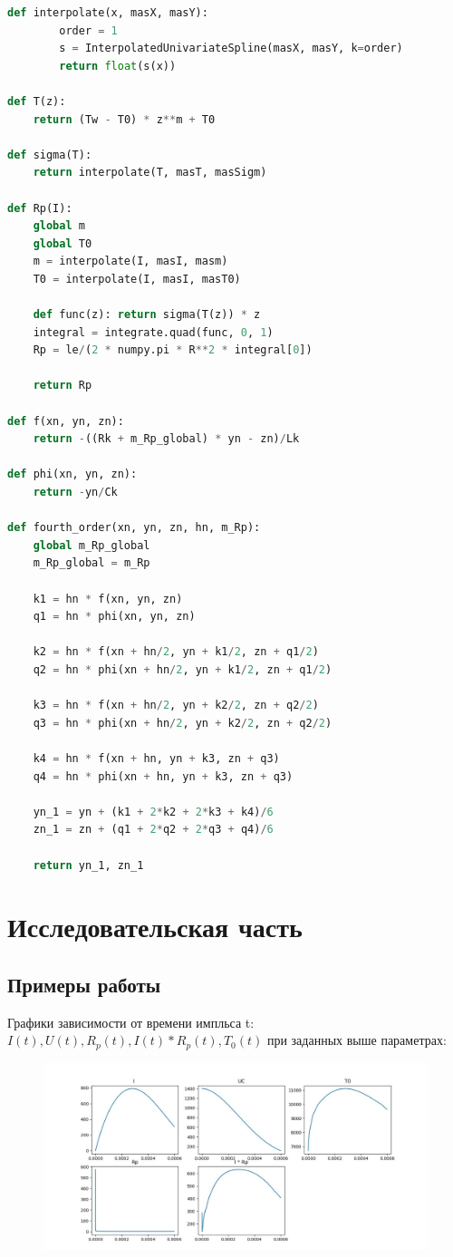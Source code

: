 \documentclass[a4paper, 12pt]{article}
\begin{document}
	\begin{lstlisting}[language=Python]
def interpolate(x, masX, masY):
		order = 1
		s = InterpolatedUnivariateSpline(masX, masY, k=order)
		return float(s(x))

def T(z):
	return (Tw - T0) * z**m + T0

def sigma(T):
	return interpolate(T, masT, masSigm)

def Rp(I):
	global m
	global T0
	m = interpolate(I, masI, masm)
	T0 = interpolate(I, masI, masT0)

	def func(z): return sigma(T(z)) * z
	integral = integrate.quad(func, 0, 1)
	Rp = le/(2 * numpy.pi * R**2 * integral[0])

	return Rp

def f(xn, yn, zn):
	return -((Rk + m_Rp_global) * yn - zn)/Lk

def phi(xn, yn, zn):
	return -yn/Ck

def fourth_order(xn, yn, zn, hn, m_Rp):
	global m_Rp_global
	m_Rp_global = m_Rp

	k1 = hn * f(xn, yn, zn)
	q1 = hn * phi(xn, yn, zn)

	k2 = hn * f(xn + hn/2, yn + k1/2, zn + q1/2)
	q2 = hn * phi(xn + hn/2, yn + k1/2, zn + q1/2)

	k3 = hn * f(xn + hn/2, yn + k2/2, zn + q2/2)
	q3 = hn * phi(xn + hn/2, yn + k2/2, zn + q2/2)

	k4 = hn * f(xn + hn, yn + k3, zn + q3)
	q4 = hn * phi(xn + hn, yn + k3, zn + q3)

	yn_1 = yn + (k1 + 2*k2 + 2*k3 + k4)/6
	zn_1 = zn + (q1 + 2*q2 + 2*q3 + q4)/6

	return yn_1, zn_1
	\end{lstlisting}

	
\clearpage
\newpage
\section{Исследовательская часть }

	
	\subsection{Примеры работы}
	Графики зависимости от времени импльса t: $I(t), U(t), R_p (t), I(t) * R_p (t), T_0 (t)$ при заданных выше параметрах:
	\begin{figure}[h]
		\centering \includegraphics[scale=0.5]{1}
	\end{figure}
	
\end{document}
